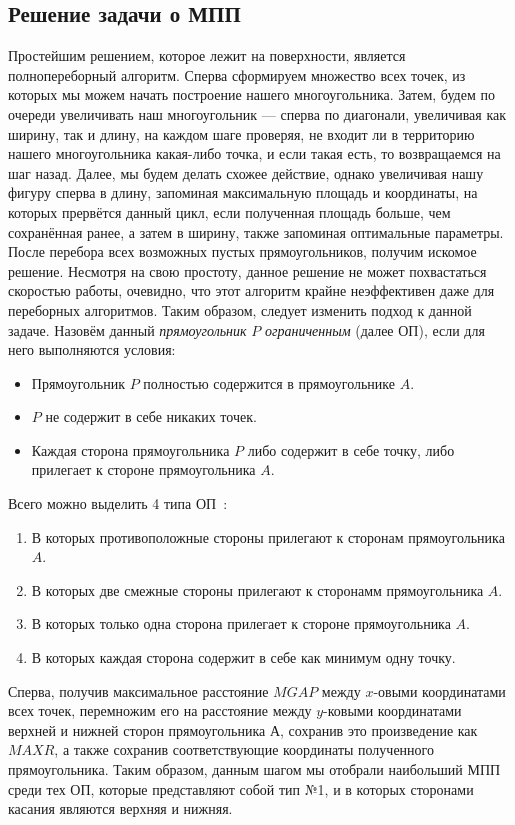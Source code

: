 \documentclass[a4paper,12pt]{article}
\begin{document}
{\subsection{Решение задачи о МПП}
Простейшим решением, которое лежит на поверхности, является полнопереборный алгоритм. Сперва сформируем множество всех точек, из которых мы можем начать построение нашего многоугольника. Затем, будем по очереди увеличивать наш многоугольник — сперва по диагонали, увеличивая как ширину, так и длину, на каждом шаге проверяя, не входит ли в территорию нашего многоугольника какая-либо точка, и если такая есть, то возвращаемся на шаг назад. Далее, мы будем делать схожее действие, однако увеличивая нашу фигуру сперва в длину, запоминая максимальную площадь и координаты, на которых прервётся данный цикл, если полученная площадь больше, чем сохранённая ранее, а затем в ширину, также запоминая оптимальные параметры. После перебора всех возможных пустых прямоугольников, получим искомое решение. \newline
Несмотря на свою простоту, данное решение не может похвастаться скоростью работы, очевидно, что этот алгоритм крайне неэффективен даже для переборных алгоритмов. Таким образом, следует изменить подход к данной задаче. \newline
Назовём данный \textit{прямоугольник} $P$ \textit{ограниченным} (далее ОП), если для него выполняются условия:
\begin{itemize}
\item Прямоугольник $P$ полностью содержится в прямоугольнике $A$.
\item $P$ не содержит в себе никаких точек.
\item Каждая сторона прямоугольника $P$ либо содержит в себе точку, либо прилегает к стороне прямоугольника $A$.
\end{itemize}
Всего можно выделить 4 типа ОП~\cite{Nandy1}:
\begin{enumerate}
\item В которых противоположные стороны прилегают к сторонам прямоугольника $A$.
\item В которых две смежные стороны прилегают к сторонамм прямоугольника $A$.
\item В которых только одна сторона прилегает к стороне прямоугольника $A$.
\item В которых каждая сторона содержит в себе как минимум одну точку.
\end{enumerate}
Сперва, получив максимальное расстояние $MGAP$ между $x$-овыми координатами всех точек, перемножим его на расстояние между $y$-ковыми координатами верхней и нижней сторон прямоугольника $А$, сохранив это произведение как $MAXR$, а также сохранив соответствующие координаты полученного прямоугольника. Таким образом, данным шагом мы отобрали наибольший МПП среди тех ОП, которые представляют собой тип №1, и в которых сторонами касания являются верхняя и нижняя. \\
}
\end{document}
